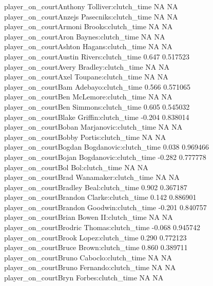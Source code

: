 \documentclass[
  landscape]{article}
\begin{document}
{player\_on\_courtAnthony Tolliver:clutch\_time NA NA\\
player\_on\_courtAnzejs Pasecniks:clutch\_time NA NA\\
player\_on\_courtArmoni Brooks:clutch\_time NA NA\\
player\_on\_courtAron Baynes:clutch\_time NA NA\\
player\_on\_courtAshton Hagans:clutch\_time NA NA\\
player\_on\_courtAustin Rivers:clutch\_time 0.647 0.517523\\
player\_on\_courtAvery Bradley:clutch\_time NA NA\\
player\_on\_courtAxel Toupane:clutch\_time NA NA\\
player\_on\_courtBam Adebayo:clutch\_time 0.566 0.571065\\
player\_on\_courtBen McLemore:clutch\_time NA NA\\
player\_on\_courtBen Simmons:clutch\_time 0.605 0.545032\\
player\_on\_courtBlake Griffin:clutch\_time -0.204 0.838014\\
player\_on\_courtBoban Marjanovic:clutch\_time NA NA\\
player\_on\_courtBobby Portis:clutch\_time NA NA\\
player\_on\_courtBogdan Bogdanovic:clutch\_time 0.038 0.969466\\
player\_on\_courtBojan Bogdanovic:clutch\_time -0.282 0.777778\\
player\_on\_courtBol Bol:clutch\_time NA NA\\
player\_on\_courtBrad Wanamaker:clutch\_time NA NA\\
player\_on\_courtBradley Beal:clutch\_time 0.902 0.367187\\
player\_on\_courtBrandon Clarke:clutch\_time 0.142 0.886901\\
player\_on\_courtBrandon Goodwin:clutch\_time -0.201 0.840757\\
player\_on\_courtBrian Bowen II:clutch\_time NA NA\\
player\_on\_courtBrodric Thomas:clutch\_time -0.068 0.945742\\
player\_on\_courtBrook Lopez:clutch\_time 0.290 0.772123\\
player\_on\_courtBruce Brown:clutch\_time 0.860 0.389711\\
player\_on\_courtBruno Caboclo:clutch\_time NA NA\\
player\_on\_courtBruno Fernando:clutch\_time NA NA\\
player\_on\_courtBryn Forbes:clutch\_time NA NA\\
}
\end{document}
